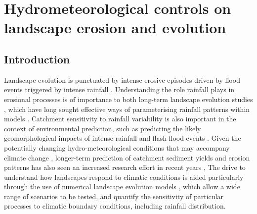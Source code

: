 \chapter{Hydrometeorological controls on landscape erosion and evolution}
\label{chapter_hydrogeomorph}

\section{Introduction}

Landscape evolution is punctuated by intense erosive episodes driven by flood events triggered by intense rainfall \citep{Wolman1960,newson1980geomorphological,Costa1995}. Understanding the role rainfall plays in erosional processes is of importance to both long-term landscape evolution studies \citep[e.g.][]{rinaldo1995geomorphological,tucker1997drainage,Tucker2000}, which have long sought effective ways of parameterising rainfall patterns within models \citep[e.g][]{Eagleson1978}.  Catchment sensitivity to rainfall variability is also important in the context of environmental prediction, such as predicting the likely geomorphological impacts of intense rainfall and flash flood events \citep[e.g.][]{lane2007interactions,deluis2010rainfall,milan2012geomorphic}. Given the potentially changing hydro-meteorological conditions that may accompany climate change \citep{Kendon2014}, longer-term prediction of catchment sediment yields and erosion patterns has also seen an increased research effort in recent years \citep{coulthard2000modelling,Coulthard2012,hancock2017sediment}, The drive to understand how landscapes respond to climatic conditions is aided particularly through the use of numerical landscape evolution models \citep{Tucker2010}, which allow a wide range of scenarios to be tested, and quantify the sensitivity of particular processes to climatic boundary conditions, including rainfall distribution.

